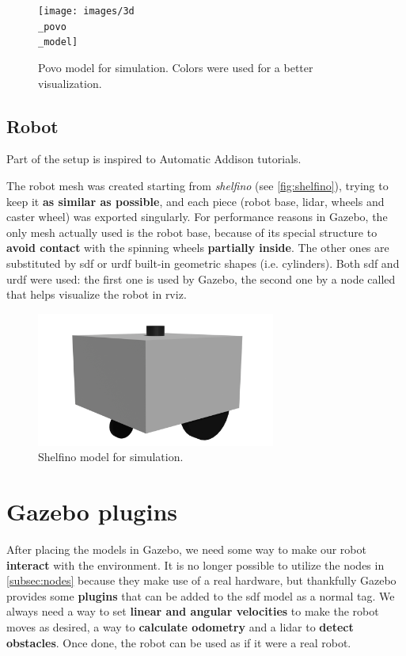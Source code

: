 \begin{figure}[h]
    \centering
    \texttt{[image: images/3d\\\_povo\\\_model]}
    \caption{Povo model for simulation. Colors were used for a better visualization.}
\end{figure}

\subsection{Robot}

Part of the setup is inspired to Automatic Addison tutorials\cite{tutorials}. %

The robot mesh was created starting from \textit{shelfino} (see \autoref{fig:shelfino}), trying to keep it \textbf{as similar as possible}, and each piece (robot base, lidar, wheels and caster wheel) was exported singularly. For performance reasons in Gazebo, the only mesh actually used is the robot base, because of its special structure to \textbf{avoid contact} with the spinning wheels \textbf{partially inside}. The other ones are substituted by \acrshort{sdf} or \acrfull{urdf} built-in geometric shapes (i.e. cylinders).
Both \acrshort{sdf} and \acrshort{urdf} were used: the first one is used by Gazebo, the second one by a node called  that helps visualize the robot in \acrshort{rviz}.

\begin{figure}[h]
    \centering
    \includegraphics[width=0.7\textwidth]{images/shelfino_3d.png}
    \caption{Shelfino model for simulation.}
\end{figure}

\section{Gazebo plugins}

After placing the models in Gazebo, we need some way to make our robot \textbf{interact} with the environment. It is no longer possible to utilize the nodes in \autoref{subsec:nodes} because they make use of a real hardware, but thankfully Gazebo provides some \textbf{plugins} that can be added to the \acrshort{sdf} model as a normal tag.
We always need a way to set \textbf{linear and angular velocities} to make the robot moves as desired, a way to \textbf{calculate odometry} and a lidar to \textbf{detect obstacles}. Once done, the robot can be used as if it were a real robot.


